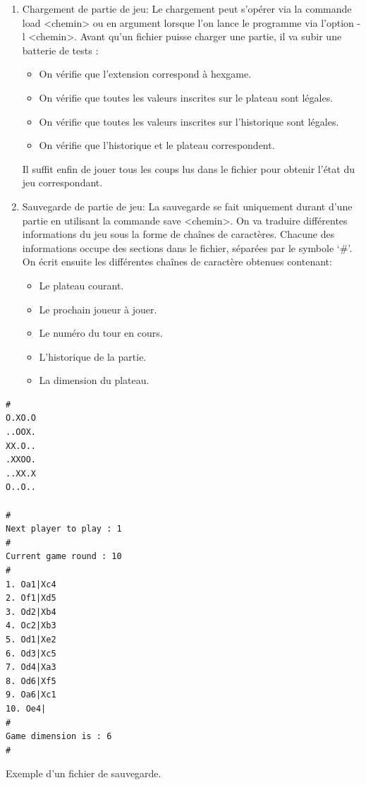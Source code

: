 \documentclass[12pt]{article}
\begin{document}
\begin{enumerate}
    \item Chargement de partie de jeu:
        Le chargement peut s’opérer via la commande load <chemin> ou en argument lorsque l’on lance le programme via l’option -l <chemin>. Avant qu’un fichier puisse charger une partie, il va subir une batterie de tests :
        \begin{itemize}
            \item On vérifie que l'extension correspond à hexgame.
            \item On vérifie que toutes les valeurs inscrites sur le plateau sont légales.
            \item On vérifie que toutes les valeurs inscrites sur l’historique sont légales.
            \item On vérifie que l’historique et le plateau correspondent.
        \end{itemize}
        Il suffit enfin de jouer tous les coups lus dans le fichier pour obtenir l'état du jeu correspondant.

    \item Sauvegarde de partie de jeu:
        La sauvegarde se fait uniquement durant d’une partie en utilisant la commande save <chemin>. On va traduire différentes informations du jeu sous la forme de chaînes de caractères. Chacune des informations occupe des sections dans le fichier, séparées par le symbole ‘\#’.
	    On écrit ensuite les différentes chaînes de caractère obtenues contenant:
        \begin{itemize}
            \item Le plateau courant.
            \item Le prochain joueur à jouer.
            \item Le numéro du tour en cours.
            \item L’historique de la partie.
            \item La dimension du plateau.
        \end{itemize}
\end{enumerate}

\bigskip
\begin{lstlisting}[style = save]
#
O.XO.O
..OOX.
XX.O..
.XXOO.
..XX.X
O..O..

#
Next player to play : 1
#
Current game round : 10
#
1. Oa1|Xc4
2. Of1|Xd5
3. Od2|Xb4
4. Oc2|Xb3
5. Od1|Xe2
6. Od3|Xc5
7. Od4|Xa3
8. Od6|Xf5
9. Oa6|Xc1
10. Oe4|
#
Game dimension is : 6
#
\end{lstlisting}
Exemple d'un fichier de sauvegarde.
\end{document}
